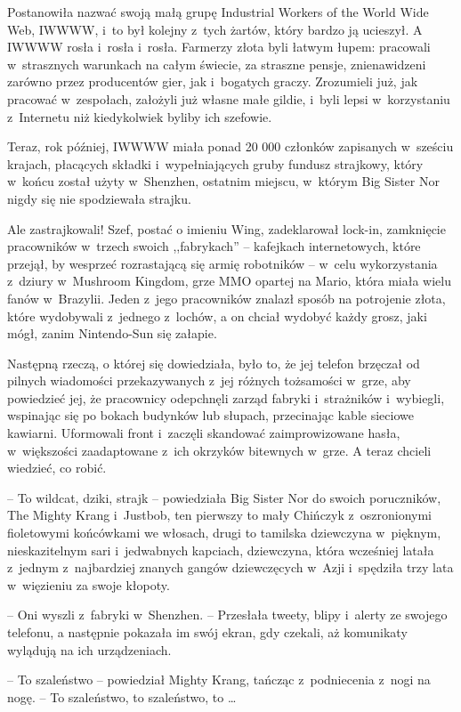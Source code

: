 \documentclass[oneside,polish,11pt,rmheadings]{mwbk}
\begin{document}
Postanowiła nazwać swoją małą grupę Industrial Workers of the World Wide Web, IWWWW, i~to był kolejny z~tych żartów, który bardzo ją ucieszył. A IWWWW rosła i~rosła i~rosła. Farmerzy złota byli łatwym łupem: pracowali w~strasznych warunkach na całym świecie, za straszne pensje, znienawidzeni zarówno przez producentów gier, jak i~bogatych graczy. Zrozumieli już, jak pracować w~zespołach, założyli już własne małe gildie, i~byli lepsi w~korzystaniu z~Internetu niż kiedykolwiek byliby ich szefowie. 


Teraz, rok później, IWWWW miała ponad 20 000 członków zapisanych w~sześciu krajach, płacących składki i~wypełniających gruby fundusz strajkowy, który w~końcu został użyty w~Shenzhen, ostatnim miejscu, w~którym Big Sister Nor nigdy się nie spodziewała strajku. 


Ale zastrajkowali! Szef, postać o imieniu Wing, zadeklarował lock-in, zamknięcie pracowników w~trzech swoich ,,fabrykach'' -- kafejkach internetowych, które przejął, by wesprzeć rozrastającą się armię robotników -- w~celu wykorzystania z~dziury w~Mushroom Kingdom, grze MMO opartej na Mario, która miała wielu fanów w~Brazylii. Jeden z~jego pracowników znalazł sposób na potrojenie złota, które wydobywali z~jednego z~lochów, a on chciał wydobyć każdy grosz, jaki mógł, zanim Nintendo-Sun się załapie. 


Następną rzeczą, o której się dowiedziała, było to, że jej telefon brzęczał od pilnych wiadomości przekazywanych z~jej różnych tożsamości w~grze, aby powiedzieć jej, że pracownicy odepchnęli zarząd fabryki i~strażników i~wybiegli, wspinając się po bokach budynków lub słupach, przecinając kable sieciowe kawiarni. Uformowali front i~zaczęli skandować zaimprowizowane hasła, w~większości zaadaptowane z~ich okrzyków bitewnych w~grze. A teraz chcieli wiedzieć, co robić. 


-- To wildcat, dziki, strajk -- powiedziała Big Sister Nor do swoich poruczników, The Mighty Krang i~Justbob, ten pierwszy to mały Chińczyk z~oszronionymi fioletowymi końcówkami we włosach, drugi to tamilska dziewczyna w~pięknym, nieskazitelnym sari i~jedwabnych kapciach, dziewczyna, która wcześniej latała z~jednym z~najbardziej znanych gangów dziewczęcych w~Azji i~spędziła trzy lata w~więzieniu za swoje kłopoty. 

-- Oni wyszli z~fabryki w~Shenzhen. -- Przesłała tweety, blipy i~alerty ze swojego telefonu, a następnie pokazała im swój ekran, gdy czekali, aż komunikaty wylądują na ich urządzeniach. 


-- To szaleństwo -- powiedział Mighty Krang, tańcząc z~podniecenia z~nogi na nogę. -- To szaleństwo, to szaleństwo, to \ldots  
\end{document}
